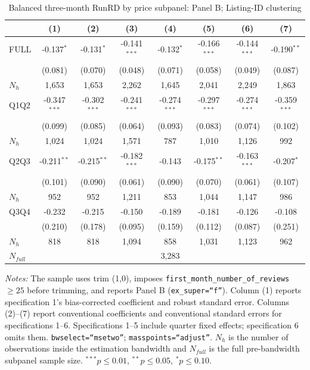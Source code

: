 \begin{table}[!htbp]
\centering
\caption{Balanced three-month RunRD by price subpanel: Panel B; Listing-ID clustering}
\scriptsize
\setlength{\tabcolsep}{5pt}
\begin{tabular}{l*{7}{c}}
\toprule
 & (1) & (2) & (3) & (4) & (5) & (6) & (7) \\
\midrule
FULL & -0.137$^{*}$ & -0.131$^{*}$ & -0.141$^{***}$ & -0.132$^{*}$ & -0.166$^{***}$ & -0.144$^{***}$ & -0.190$^{**}$ \\
 & (0.081) & (0.070) & (0.048) & (0.071) & (0.058) & (0.049) & (0.087) \\
$N_h$ & 1,653 & 1,653 & 2,262 & 1,645 & 2,041 & 2,249 & 1,863 \\
\addlinespace
Q1Q2 & -0.347$^{***}$ & -0.302$^{***}$ & -0.241$^{***}$ & -0.274$^{***}$ & -0.297$^{***}$ & -0.274$^{***}$ & -0.359$^{***}$ \\
 & (0.099) & (0.085) & (0.064) & (0.093) & (0.083) & (0.074) & (0.102) \\
$N_h$ & 1,024 & 1,024 & 1,571 & 787 & 1,010 & 1,126 & 992 \\
\addlinespace
Q2Q3 & -0.211$^{**}$ & -0.215$^{**}$ & -0.182$^{***}$ & -0.143 & -0.175$^{**}$ & -0.163$^{***}$ & -0.207$^{*}$ \\
 & (0.101) & (0.090) & (0.061) & (0.090) & (0.070) & (0.061) & (0.107) \\
$N_h$ & 952 & 952 & 1,211 & 853 & 1,044 & 1,147 & 986 \\
\addlinespace
Q3Q4 & -0.232 & -0.215 & -0.150 & -0.189 & -0.181 & -0.126 & -0.108 \\
 & (0.210) & (0.178) & (0.095) & (0.159) & (0.112) & (0.087) & (0.251) \\
$N_h$ & 818 & 818 & 1,094 & 858 & 1,031 & 1,123 & 962 \\

\midrule
$N_{full}$ & \multicolumn{7}{c}{3,283} \\
\bottomrule
\end{tabular}
\begin{minipage}{0.98\textwidth}
\footnotesize
\textit{Notes:} The sample uses trim (1,0), imposes \texttt{first\_month\_number\_of\_reviews}$\geq25$ before trimming, and reports Panel B (\texttt{ex\_super=``f''}). Column (1) reports specification 1's bias-corrected coefficient and robust standard error. Columns (2)--(7) report conventional coefficients and conventional standard errors for specifications 1--6. Specifications 1--5 include quarter fixed effects; specification 6 omits them. \texttt{bwselect=``msetwo''}; \texttt{masspoints=``adjust''}. $N_h$ is the number of observations inside the estimation bandwidth and $N_{full}$ is the full pre-bandwidth subpanel sample size. $^{***}p\leq0.01$, $^{**}p\leq0.05$, $^{*}p\leq0.10$.
\end{minipage}
\end{table}
\clearpage
